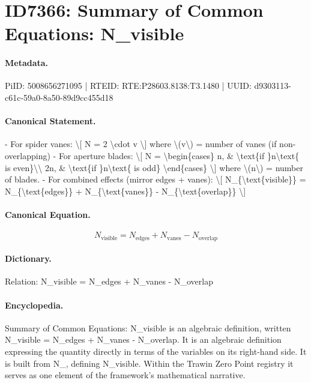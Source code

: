 \section*{ID7366: Summary of Common Equations: N\_visible}
\paragraph{Metadata.}
PiID: 5008656271095 | RTEID: RTE:P28603.8138:T3.1480 | UUID: d9303113-c61c-59a0-8a50-89d9cc455d18

\paragraph{Canonical Statement.}
- For spider vanes: \textbackslash{}[ N = 2 \textbackslash{}cdot v \textbackslash{}] where \textbackslash{}(v\textbackslash{}) = number of vanes (if non-overlapping) - For aperture blades: \textbackslash{}[ N = \textbackslash{}begin\{cases\} n, \& \textbackslash{}text\{if \}n\textbackslash{}text\{ is even\}\textbackslash{}\textbackslash{} 2n, \& \textbackslash{}text\{if \}n\textbackslash{}text\{ is odd\} \textbackslash{}end\{cases\} \textbackslash{}] where \textbackslash{}(n\textbackslash{}) = number of blades. - For combined effects (mirror edges + vanes): \textbackslash{}[ N\_\{\textbackslash{}text\{visible\}\} = N\_\{\textbackslash{}text\{edges\}\} + N\_\{\textbackslash{}text\{vanes\}\} - N\_\{\textbackslash{}text\{overlap\}\} \textbackslash{}]

\paragraph{Canonical Equation.}
\[
N_{\text{visible}} = N_{\text{edges}} + N_{\text{vanes}} - N_{\text{overlap}}
\]

\paragraph{Dictionary.}
Relation: N\_visible = N\_edges + N\_vanes - N\_overlap

\paragraph{Encyclopedia.}
Summary of Common Equations: N\_visible is an algebraic definition, written N\_visible = N\_edges + N\_vanes - N\_overlap. It is an algebraic definition expressing the quantity directly in terms of the variables on its right-hand side. It is built from N\_, defining N\_visible. Within the Trawin Zero Point registry it serves as one element of the framework's mathematical narrative.
